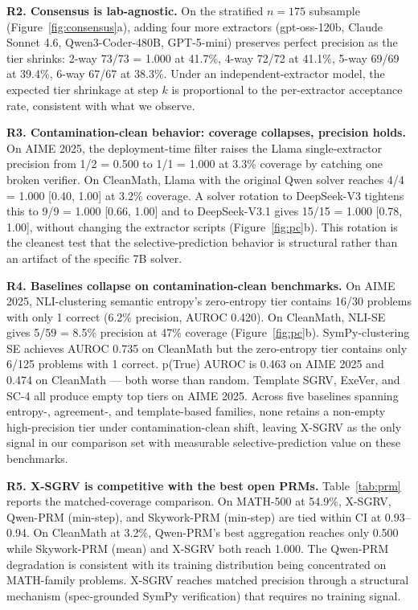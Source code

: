 \documentclass{article}
\begin{document}
\textbf{R2. Consensus is lab-agnostic.} On the stratified $n{=}175$ subsample (Figure~\ref{fig:consensus}a), adding four more extractors (gpt-oss-120b, Claude Sonnet 4.6, Qwen3-Coder-480B, GPT-5-mini) preserves perfect precision as the tier shrinks: 2-way 73/73 = 1.000 at 41.7\%, 4-way 72/72 at 41.1\%, 5-way 69/69 at 39.4\%, 6-way 67/67 at 38.3\%. Under an independent-extractor model, the expected tier shrinkage at step $k$ is proportional to the per-extractor acceptance rate, consistent with what we observe.

\textbf{R3. Contamination-clean behavior: coverage collapses, precision holds.} On AIME 2025, the deployment-time filter raises the Llama single-extractor precision from 1/2 = 0.500 to 1/1 = 1.000 at 3.3\% coverage by catching one broken verifier. On CleanMath, Llama with the original Qwen solver reaches 4/4 = 1.000 [0.40, 1.00] at 3.2\% coverage. A solver rotation to DeepSeek-V3 tightens this to 9/9 = 1.000 [0.66, 1.00] and to DeepSeek-V3.1 gives 15/15 = 1.000 [0.78, 1.00], without changing the extractor scripts (Figure~\ref{fig:pc}b). This rotation is the cleanest test that the selective-prediction behavior is structural rather than an artifact of the specific 7B solver.

\textbf{R4. Baselines collapse on contamination-clean benchmarks.} On AIME 2025, NLI-clustering semantic entropy's zero-entropy tier contains 16/30 problems with only 1 correct (6.2\% precision, AUROC 0.420). On CleanMath, NLI-SE gives 5/59 = 8.5\% precision at 47\% coverage (Figure~\ref{fig:pc}b). SymPy-clustering SE achieves AUROC 0.735 on CleanMath but the zero-entropy tier contains only 6/125 problems with 1 correct. p(True) AUROC is 0.463 on AIME 2025 and 0.474 on CleanMath --- both worse than random. Template SGRV, ExeVer, and SC-4 all produce empty top tiers on AIME 2025. Across five baselines spanning entropy-, agreement-, and template-based families, none retains a non-empty high-precision tier under contamination-clean shift, leaving X-SGRV as the only signal in our comparison set with measurable selective-prediction value on these benchmarks.

\textbf{R5. X-SGRV is competitive with the best open PRMs.} Table~\ref{tab:prm} reports the matched-coverage comparison. On MATH-500 at 54.9\%, X-SGRV, Qwen-PRM (min-step), and Skywork-PRM (min-step) are tied within CI at 0.93--0.94. On CleanMath at 3.2\%, Qwen-PRM's best aggregation reaches only 0.500 while Skywork-PRM (mean) and X-SGRV both reach 1.000. The Qwen-PRM degradation is consistent with its training distribution being concentrated on MATH-family problems. X-SGRV reaches matched precision through a structural mechanism (spec-grounded SymPy verification) that requires no training signal.
\end{document}

